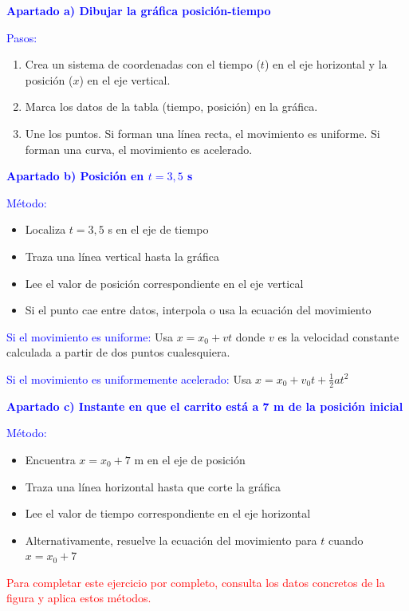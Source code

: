 \begin{exercise}
\begin{solu}
        \textbf{\textcolor{blue}{Apartado a) Dibujar la gráfica posición-tiempo}}

        \textcolor{blue}{Pasos:}
        \begin{enumerate}
            \item Crea un sistema de coordenadas con el tiempo ($t$) en el eje horizontal y la posición ($x$) en el eje vertical.
            \item Marca los datos de la tabla (tiempo, posición) en la gráfica.
            \item Une los puntos. Si forman una línea recta, el movimiento es uniforme. Si forman una curva, el movimiento es acelerado.
        \end{enumerate}

        \textbf{\textcolor{blue}{Apartado b) Posición en $t = 3,5$ s}}

        \textcolor{blue}{Método:}
        \begin{itemize}
            \item Localiza $t = 3,5$ s en el eje de tiempo
            \item Traza una línea vertical hasta la gráfica
            \item Lee el valor de posición correspondiente en el eje vertical
            \item Si el punto cae entre datos, interpola o usa la ecuación del movimiento
        \end{itemize}

        \textcolor{blue}{Si el movimiento es uniforme:} Usa $x = x_0 + vt$ donde $v$ es la velocidad constante calculada a partir de dos puntos cualesquiera.

        \textcolor{blue}{Si el movimiento es uniformemente acelerado:} Usa $x = x_0 + v_0 t + \frac{1}{2}at^2$

        \textbf{\textcolor{blue}{Apartado c) Instante en que el carrito está a 7 m de la posición inicial}}

        \textcolor{blue}{Método:}
        \begin{itemize}
            \item Encuentra $x = x_0 + 7$ m en el eje de posición
            \item Traza una línea horizontal hasta que corte la gráfica
            \item Lee el valor de tiempo correspondiente en el eje horizontal
            \item Alternativamente, resuelve la ecuación del movimiento para $t$ cuando $x = x_0 + 7$
        \end{itemize}

        \textcolor{red}{Para completar este ejercicio por completo, consulta los datos concretos de la figura y aplica estos métodos.}
    \end{solu}
\end{exercise}

